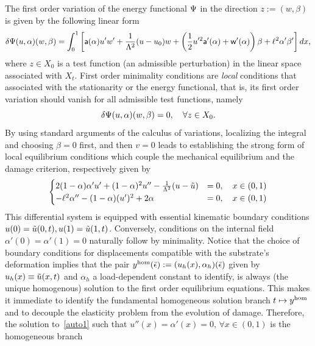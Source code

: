 \documentclass[10pt]{article}
\begin{document}
The first order variation of the energy functional $\Psi$ in the direction $z:=(w, \beta)$ is given by the following linear form  
\begin{equation}
    \delta \Psi(u,\alpha)(w,\beta)=\int_0^1
\left[\mathsf{a}(\alpha)u'w'+\frac{1}{\Lambda^2} (u-u_0) w+ \left( \frac{1}{2}u'^2 \mathsf{a}'(\alpha)+\mathsf{w}'(\alpha) \right)\beta+\ell^2\alpha'\beta' \right]dx,\label{firstvar1}
\end{equation}
where 
%
$z\in X_0$ is a test function (an admissible perturbation) in the linear space associated with  $X_t$. First order minimality conditions are \emph{local} conditions that associated with  the stationarity or the energy functional, that is, its first order variation should vanish for all admissible test functions, namely
\begin{equation}
    \label{eq:stationarity}
    \delta \Psi(u,\alpha)(w,\beta)=0, \quad \forall z\in X_0.
\end{equation}
%
By using standard arguments of the calculus of variations, localizing the integral and choosing $\beta = 0$ first, and then $v =0$ leads to establishing the strong form of local equilibrium conditions which couple the mechanical equilibrium and the damage criterion, respectively given by
\begin{eqnarray}
\begin{cases}
  2(1-\alpha)\alpha' u' +(1-\alpha)^2 u'' -  \frac{1}{\Lambda^2}(u-\tilde u) &= 0, \quad {x\in (0, 1)}\\
  -\ell^2\alpha'' - (1-\alpha)( u')^2 + 2\alpha   &= 0, \quad {x\in (0, 1)}
\end{cases}
\label{auto1}
\end{eqnarray}
%
This differential system is equipped with essential kinematic boundary conditions $u(0) = \tilde u(0, t), u(1) = \tilde u(1, t)$. Conversely, conditions on the internal field $\alpha'(0)=\alpha'(1)=0$ naturally follow by minimality.
%
Notice that the choice of boundary conditions for displacements compatible with the substrate's deformation implies that the pair $y^{\text{hom}}(\bar\epsilon):=(u_h(x), \alpha_h)(\bar\epsilon)$ given by $u_h(x)\equiv \tilde u(x, t)$ and $\alpha_h$ a load-dependent constant to identify, is always (the unique homogenous) solution to the first order equilibrium equations. This makes it immediate to identify the fundamental homogeneous solution branch $t \mapsto y^{\text{hom}}$ and to decouple the elasticity problem from the  evolution of damage. 
Therefore, the solution to~\eqref{auto1} such that $u''(x)=\alpha'(x)= 0, \, \forall x\in (0, 1)$ is the homogeneous branch
\end{document}
